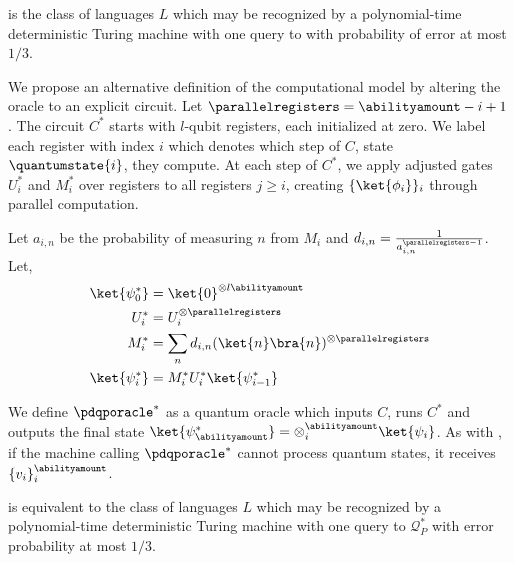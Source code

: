 \begin{definition}\label{definition_pdqp_original}
    \pdqpname is the class of languages $L$ which may be recognized by a polynomial-time deterministic Turing machine with one query to \pdqporacle with probability of error at most $1/3$.
\end{definition}

We propose an alternative definition of the computational model by altering the oracle \pdqporacle to an explicit circuit. Let $\parallelregisters=\abilityamount-i+1$. The circuit $C^*$ starts with \abilityamount $l\text{-qubit}$ registers, each initialized at zero. We label each register with index $i$ which denotes which step of $C$, state $\quantumstate{i}$, they compute. At each step of $C^*$, we apply adjusted gates $U^*_i$ and $M^*_i$ over \parallelregisters registers to all registers $j\geq i$, creating $\{\ket{\phi_i}\}_i$ through parallel computation.

Let $a_{i,n}$ be the probability of measuring $n$ from $M_i$ and $d_{i,n} = \frac{1}{a_{i,n}^{\parallelregisters-1}}$. Let,
\begin{align}
    \ket{\psi_0^*} &= \ket{0}^{\otimes l \abilityamount} \\
    U_i^* &= U_i^{\otimes \parallelregisters} \\
    M_i^* &= \sum_n d_{i,n} (\ket{n}\bra{n})^{\otimes \parallelregisters} \label{eq_our_definition_measurement}\\
    \ket{\psi_{i}^*} &= M_i^*U_i^*\ket{\psi_{i-1}^*}
\end{align}

We define $\pdqporacle^*$ as a quantum oracle which inputs $C$, runs $C^*$ and outputs the final state $\ket{\psi_{\abilityamount}^*} = \otimes_i^{\abilityamount} \ket{\psi_i}$. As with \pdqporacle, if the machine calling $\pdqporacle^*$ cannot process quantum states, it receives $\{v_i\}_i^{\abilityamount}$.

\begin{proposition}\label{proposition_equivalent_models}
    \pdqpname is equivalent to the class of languages $L$ which may be recognized by a polynomial-time deterministic Turing machine with one query to $\mathcal{Q}_P^*$ with error probability at most $1/3$.
\end{proposition}

